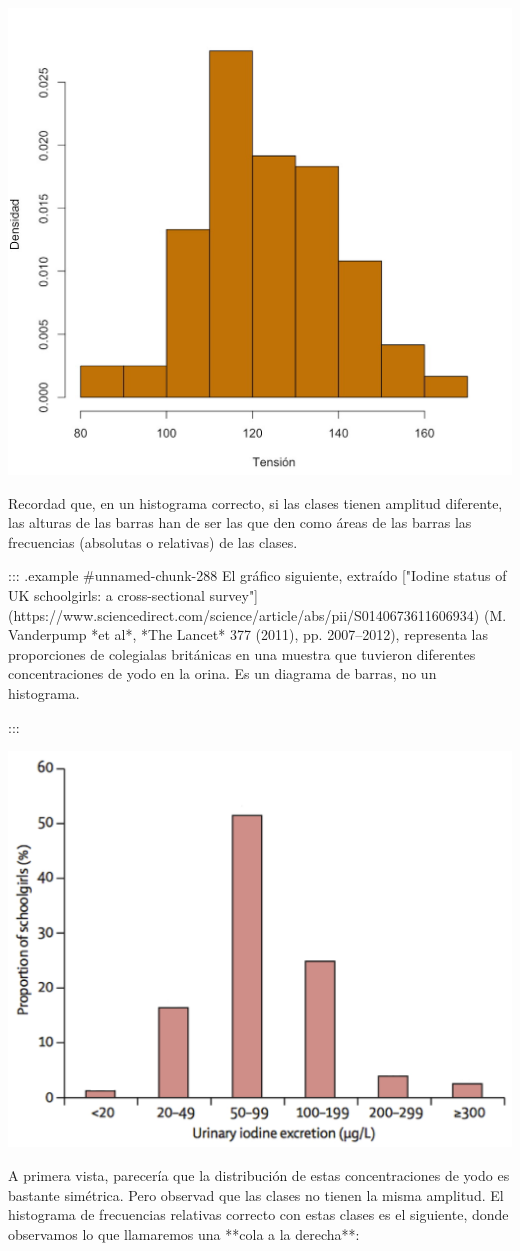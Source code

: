 \documentclass[
]{book}
\theoremstyle{definition}
\theoremstyle{definition}
\theoremstyle{definition}
\theoremstyle{definition}
\theoremstyle{remark}
\begin{document}
\begin{center}\includegraphics[width=0.6\linewidth]{INREMDN_files/figure-html/tensio5} \end{center}


Recordad  que, en un histograma correcto, si las clases tienen amplitud diferente, las alturas de las barras han de ser las que den como áreas de las barras las frecuencias (absolutas o relativas) de las clases.

::: {.example #unnamed-chunk-288}
El gráfico siguiente, extraído ["Iodine status of UK schoolgirls: a cross-sectional survey"](https://www.sciencedirect.com/science/article/abs/pii/S0140673611606934) (M. Vanderpump *et al*, *The Lancet* 377 (2011), pp. 2007–2012),  representa las proporciones de colegialas británicas en una muestra que tuvieron diferentes concentraciones de yodo en la orina. Es un diagrama de barras, no un histograma.

:::


\begin{center}\includegraphics[width=0.6\linewidth]{INREMDN_files/figure-html/urine3} \end{center}

A primera vista, parecería que la distribución de estas concentraciones de yodo es bastante simétrica. Pero observad que las clases no tienen la misma amplitud. El histograma de frecuencias relativas correcto con estas clases es el siguiente, donde observamos lo que llamaremos una **cola a la derecha**:
\end{document}
